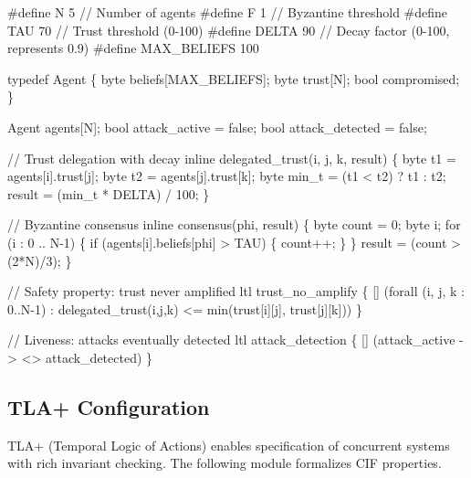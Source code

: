 \documentclass[
]{article}
\newenvironment{Shaded}{}{}
\newcommand{\NormalTok}[1]{#1}
\begin{document}
\begin{Shaded}
\begin{Highlighting}[]
\NormalTok{\#define N 5           // Number of agents}
\NormalTok{\#define F 1           // Byzantine threshold}
\NormalTok{\#define TAU 70        // Trust threshold (0{-}100)}
\NormalTok{\#define DELTA 90      // Decay factor (0{-}100, represents 0.9)}
\NormalTok{\#define MAX\_BELIEFS 100}

\NormalTok{typedef Agent \{}
\NormalTok{  byte beliefs[MAX\_BELIEFS];}
\NormalTok{  byte trust[N];}
\NormalTok{  bool compromised;}
\NormalTok{\}}

\NormalTok{Agent agents[N];}
\NormalTok{bool attack\_active = false;}
\NormalTok{bool attack\_detected = false;}

\NormalTok{// Trust delegation with decay}
\NormalTok{inline delegated\_trust(i, j, k, result) \{}
\NormalTok{  byte t1 = agents[i].trust[j];}
\NormalTok{  byte t2 = agents[j].trust[k];}
\NormalTok{  byte min\_t = (t1 \textless{} t2) ? t1 : t2;}
\NormalTok{  result = (min\_t * DELTA) / 100;}
\NormalTok{\}}

\NormalTok{// Byzantine consensus}
\NormalTok{inline consensus(phi, result) \{}
\NormalTok{  byte count = 0;}
\NormalTok{  byte i;}
\NormalTok{  for (i : 0 .. N{-}1) \{}
\NormalTok{    if (agents[i].beliefs[phi] \textgreater{} TAU) \{}
\NormalTok{      count++;}
\NormalTok{    \}}
\NormalTok{  \}}
\NormalTok{  result = (count \textgreater{} (2*N)/3);}
\NormalTok{\}}

\NormalTok{// Safety property: trust never amplified}
\NormalTok{ltl trust\_no\_amplify \{}
\NormalTok{  [] (forall (i, j, k : 0..N{-}1) :}
\NormalTok{    delegated\_trust(i,j,k) \textless{}= min(trust[i][j], trust[j][k]))}
\NormalTok{\}}

\NormalTok{// Liveness: attacks eventually detected}
\NormalTok{ltl attack\_detection \{}
\NormalTok{  [] (attack\_active {-}\textgreater{} \textless{}\textgreater{} attack\_detected)}
\NormalTok{\}}
\end{Highlighting}
\end{Shaded}

\subsection{TLA+ Configuration}\label{sec:tla-config}

TLA+ (Temporal Logic of Actions) enables specification of concurrent
systems with rich invariant checking. The following module formalizes
CIF properties.
\end{document}
